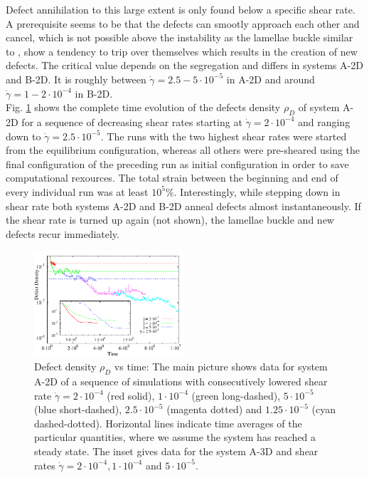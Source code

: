 \documentclass[8.5pt,twoside,twocolumn]{article}
\newcommand{\e}[1]{\cdot10^{#1}}
\newcommand{\gd}{\dot{\gamma}}
\begin{document}
Defect annihilation to this large extent is only found below a specific shear rate.
A prerequisite seems to be that the defects can smootly approach each other and cancel, which is not possible above the instability as the lamellae buckle similar to \cite{Gonnella98}, show a tendency to trip over themselves which results in the creation of new defects.
The critical value depends on the segregation and differs in systems A-2D and B-2D.
It is roughly between $\dot{\gamma}=2.5-5\e{-5}$ in A-2D and around $\dot{\gamma}=1-2\e{-4}$ in B-2D.\\
Fig. \ref{fig6} shows the  complete time evolution of the defects density $\rho_D$ of system A-2D for a sequence of decreasing shear rates starting at $\gd=2\e{-4}$ and ranging down to $\gd=2.5\e{-5}$.
The runs with the two highest shear rates were started from the equilibrium configuration, whereas all others were pre-sheared using the final configuration of the preceding run as initial configuration in order to save computational rexources.
The total strain between the beginning and end of every individual run was at least $10^{5}\%$.
Interestingly, while stepping down in shear rate both systems A-2D and B-2D anneal defects almost instantaneously.
If the shear rate is turned up again (not shown), the lamellae buckle and new defects recur immediately.

\begin{figure}[htp!]
\centering
\includegraphics[angle=0,width=0.5\textwidth]{defect_density_5e-4.pdf}
\caption{Defect density $\rho_D$ vs time: The main picture shows data for system A-2D of a sequence of simulations with consecutively lowered shear rate $\dot{\gamma}=2\e{-4}$ (red solid), $1\e{-4}$ (green long-dashed),  $5\e{-5}$ (blue short-dashed),  $2.5\e{-5}$ (magenta dotted) and  $1.25\e{-5}$ (cyan dashed-dotted). Horizontal lines indicate time averages of the particular quantities, where we assume the system has reached a steady state. The inset gives data for the system A-3D and shear rates $\dot{\gamma}=2\cdot10^{-4}, 1\cdot10^{-4}$ and $5\cdot10^{-5}$.} 
\label{fig6}
\end{figure}
\end{document}
